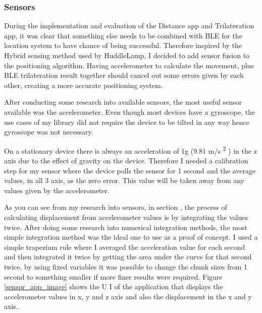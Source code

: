 \subsubsection{Sensors} \label{nocamera_sensors}
During the implementation and evaluation of the Distance app and Trilateration app, it was clear that something else needs to be combined with BLE for the location system to have chance of being successful. Therefore inspired by the Hybrid sensing method used by HuddleLamp, I decided to add sensor fusion to the positioning algorithm. Having accelerometer to calculate the movement, plus BLE trilateration result together should cancel out some errors given by each other, creating a more accurate positioning system.

After conducting some research into available sensors, the most useful sensor available was the accelerometer. Even though most devices have a gyroscope, the use cases of my library did not require the device to be tilted in any way hence gyroscope was not necessary. 

On a stationary device there is always an acceleration of 1g (9.81 m/s \textsuperscript{2} )
in the z axis due to the effect of gravity on the device. Therefore I needed a calibration step for my sensor where the device polls the sensor for 1 second and the average values, in all 3 axis, as the zero error. This value will be taken away from any values given by the accelerometer.

As you can see from my research into sensors, in section , the process of calculating displacement from accelerometer values is by integrating the values twice. After doing some research into numerical integration methods, the most simple integration method was the ideal one to use as a proof of concept. I used a simple trapezium rule where I averaged the acceleration value for each second and then integrated it twice by getting the area under the curve for that second twice. by using fixed variables it was possible to change the chunk sizes from 1 second to something smaller if more finer results were required.
Figure \ref{sensor_app_image} shows the U I of the application that displays the accelerometer values in x, y and z axis and also the displacement in the x and y axis.


